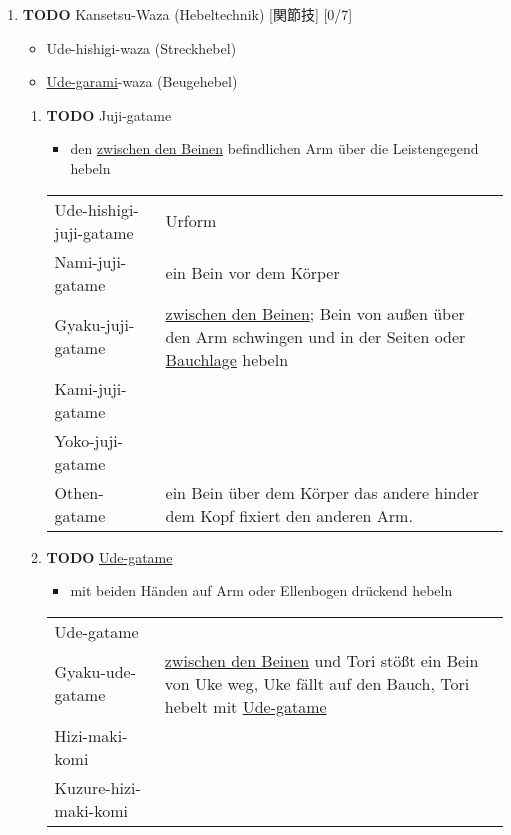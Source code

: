 \documentclass[11pt]{article}
\begin{document}
\begin{enumerate}
\item {\bfseries\sffamily TODO} Kansetsu-Waza (Hebeltechnik) [関節技] [0/7]
\label{sec:org047dbb4}

\begin{itemize}
\item Ude-hishigi-waza (Streckhebel)
\item \hyperref[org3627c27]{Ude-garami}-waza (Beugehebel)
\end{itemize}

\begin{enumerate}
\item {\bfseries\sffamily TODO} Juji-gatame
\label{sec:org73b01be}

\begin{itemize}
\item den \hyperref[orgd3451e7]{zwischen den Beinen} befindlichen Arm über die Leistengegend hebeln
\end{itemize}

\begin{center}
\begin{tabular}{ll}
\label{org4898d0b}Ude-hishigi-juji-gatame & Urform\\
\label{org968259e}Nami-juji-gatame & ein Bein vor dem Körper\\
\label{org05dd446}Gyaku-juji-gatame & \hyperref[orgd3451e7]{zwischen den Beinen}; Bein von außen über den Arm schwingen und in der Seiten oder \hyperref[orgf42100a]{Bauchlage} hebeln\\
\label{org7f23cbd}Kami-juji-gatame & \\
\label{orgcb5e5d0}Yoko-juji-gatame & \\
\label{orgb590763}Othen-gatame & ein Bein über dem Körper das andere hinder dem Kopf fixiert den anderen Arm.\\
\end{tabular}
\end{center}

\item {\bfseries\sffamily TODO} \hyperref[orgca3a14b]{Ude-gatame}
\label{sec:org5334305}

\begin{itemize}
\item mit beiden Händen auf Arm oder Ellenbogen drückend hebeln
\end{itemize}

\begin{center}
\begin{tabular}{ll}
\label{orgca3a14b}Ude-gatame & \\
\label{org2e51b6d}Gyaku-ude-gatame & \hyperref[orgd3451e7]{zwischen den Beinen} und Tori stößt ein Bein von Uke weg, Uke fällt auf den Bauch, Tori hebelt mit \hyperref[orgca3a14b]{Ude-gatame}\\
\label{orgeb279df}Hizi-maki-komi & \\
\label{org72836bb}Kuzure-hizi-maki-komi & \\
\end{tabular}
\end{center}


\end{enumerate}
\end{enumerate}
\end{document}
